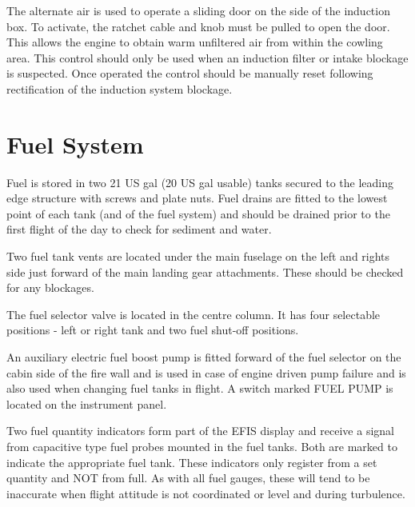
The alternate air is used to operate a sliding door on the side of the induction box. To activate, the ratchet cable
and knob must be pulled to open the door. This allows the engine to obtain warm unfiltered air from within the
cowling area. This control should only be used when an induction filter or intake blockage is suspected. Once
operated the control should be manually reset following rectification of the induction system blockage.

\section{Fuel System}
Fuel is stored in two 21 US gal (20 US gal usable) tanks secured to the leading edge structure with screws and
plate nuts. Fuel drains are fitted to the lowest point of each tank (and of the fuel system) and should be drained
prior to the first flight of the day to check for sediment and water.

Two fuel tank vents are located under the main fuselage on the left and rights side just forward of the main
landing gear attachments. These should be checked for any blockages.

The fuel selector valve is located in the centre column. It has four selectable positions - left or right tank and two
fuel shut-off positions.

An auxiliary electric fuel boost pump is fitted forward of the fuel selector on the cabin side of the fire wall and is
used in case of engine driven pump failure and is also used %
when changing fuel
tanks in flight. A switch marked FUEL PUMP is located on the instrument panel.

Two fuel quantity indicators form part of the EFIS display and receive a signal from capacitive type fuel
probes mounted in the fuel tanks. Both are marked to indicate the appropriate fuel tank. These indicators only
register from a set quantity and NOT from full. As with all fuel gauges, these will tend to be inaccurate
when flight attitude is not coordinated or level and during turbulence.

